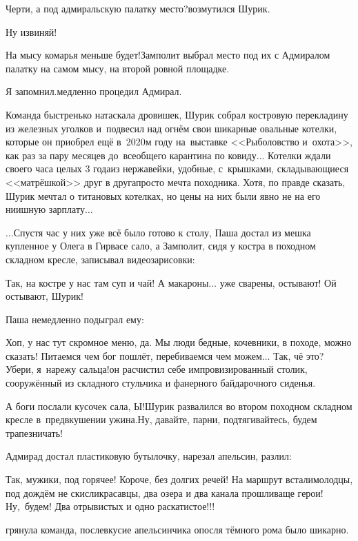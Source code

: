 \diagdash Черти, а под адмиральскую палатку место?\mdash возмутился Шурик.

\diagdash Ну извиняй!

\diagdash На мысу комарья меньше будет!\mdash Замполит выбрал место под их с Адмиралом палатку на самом мысу, на второй ровной площадке.

\diagdash Я запомнил.\mdash медленно процедил Адмирал.

Команда быстренько натаскала дровишек, Шурик собрал костровую перекладину из железных уголков и~подвесил над огнём свои шикарные овальные котелки, которые он приобрел ещё в~2020\sdash м году на~выставке <<Рыболовство и~охота>>, как раз за пару месяцев до~всеобщего карантина по ковиду$\ldots$ Котелки ждали своего часа целых 3 года\mdash из нержавейки, удобные, с~крышками, складывающиеся <<матрёшкой>> друг в друга\mdash просто мечта походника. Хотя, по правде сказать, Шурик мечтал о титановых котелках, но цены на них были явно не на его нии\sdash шную зарплату$\ldots$

$\ldots$Спустя час у них уже всё было готово к столу, Паша достал из мешка купленное у Олега в Гирвасе сало, а Замполит, сидя у костра в походном складном кресле, записывал видеозарисовки:

\diagdash Так, на костре у нас там суп и чай! А макароны$\ldots$ уже сварены, остывают! Ой остывают, Шурик!

Паша немедленно подыграл ему:

\diagdash Хоп, у нас тут скромное меню, да. Мы люди бедные, кочевники, в походе, можно сказать! Питаемся чем бог пошлёт, перебиваемся чем можем$\ldots$ Так, чё это? Убери, я~нарежу сальца!\mdash он расчистил себе импровизированный столик, сооружённый из складного стульчика и фанерного байдарочного сиденья.

\diagdash А боги послали кусочек сала, Ы!\mdash Шурик развалился во втором походном складном кресле в~предвкушении ужина.\mdash Ну, давайте, парни, подтягивайтесь, будем трапезничать!

Адмирад достал пластиковую бутылочку, нарезал апельсин, разлил: 

\diagdash Так, мужики, под горячее! Короче, без долгих речей! На маршрут встали\mdash молодцы, под дождём не скисли\mdash красавцы, два озера и два канала прошли\mdash ваще герои! Ну,~будем! Два отрывистых и одно раскатистое!!!

\mdash грянула команда, послевкусие апельсинчика опосля тёмного рома было шикарно.


